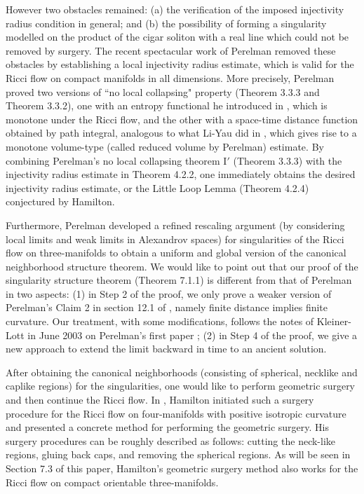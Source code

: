However two obstacles remained: (a) the verification of the
imposed injectivity radius condition in general; and (b) the
possibility of forming a singularity modelled on the product of
the cigar soliton with a real line which could not be removed by
surgery. The recent spectacular work of Perelman \cite{P1} removed
these obstacles by establishing a local injectivity radius
estimate, which is valid for the Ricci flow on compact manifolds
in all dimensions. More precisely, Perelman proved two versions of
``no local collapsing" property (Theorem 3.3.3 and Theorem 3.3.2),
one with an entropy functional he introduced in \cite{P1}, which
is monotone under the Ricci flow, and the other with a space-time
distance function obtained by path integral, analogous to what
Li-Yau did in \cite{LY}, which gives rise to a monotone
volume-type (called reduced volume by Perelman) estimate. By
combining Perelman's no local collapsing theorem I${'}$ (Theorem
3.3.3) with the injectivity radius estimate in Theorem 4.2.2, one
immediately obtains the desired injectivity radius estimate, or
the Little Loop Lemma (Theorem 4.2.4) conjectured by Hamilton.

Furthermore, Perelman \cite{P1} developed a refined rescaling
argument (by considering local limits and weak limits in
Alexandrov spaces) for singularities of the Ricci flow on
three-manifolds to obtain a uniform and global version of the
canonical neighborhood structure theorem. We would like to point
out that our proof of the singularity structure theorem (Theorem
7.1.1) is different from that of Perelman in two aspects: (1) in
Step 2 of the proof, we only prove a weaker version of Perelman's
Claim 2 in section 12.1 of \cite{P1}, namely finite distance
implies finite curvature. Our treatment, with some modifications,
follows the notes of Kleiner-Lott \cite{KL} in June 2003 on
Perelman's first paper \cite{P1}; (2) in Step 4 of the proof, we
give a new approach to extend the limit backward in time to an
ancient solution.

\vskip 0.1cm 

After obtaining the canonical neighborhoods (consisting of
spherical, necklike and caplike regions) for the singularities,
one would like to perform geometric surgery and then continue the
Ricci flow. In \cite{Ha97}, Hamilton initiated such a surgery
procedure for the Ricci flow on four-manifolds with positive
isotropic curvature and presented a concrete method for performing
the geometric surgery. His surgery procedures can be roughly
described as follows: cutting the neck-like regions, gluing back
caps, and removing the spherical regions. As will be seen in
Section 7.3 of this paper, Hamilton's geometric surgery method
also works for the Ricci flow on compact orientable
three-manifolds.

